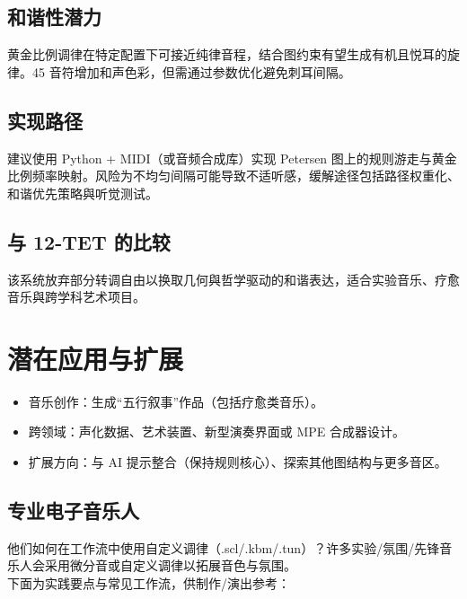 \documentclass{article}
\begin{document}
\subsection{和谐性潜力}
黄金比例调律在特定配置下可接近纯律音程，结合图约束有望生成有机且悦耳的旋律。45 音符增加和声色彩，但需通过参数优化避免刺耳间隔。

\subsection{实现路径}
建议使用 Python + MIDI（或音频合成库）实现 Petersen 图上的规则游走与黄金比例频率映射。风险为不均匀间隔可能导致不适听感，缓解途径包括路径权重化、和谐优先策略與听觉测试。

\subsection{与 12-TET 的比较}
该系统放弃部分转调自由以换取几何與哲学驱动的和谐表达，适合实验音乐、疗愈音乐與跨学科艺术项目。

\section{潜在应用与扩展}
\begin{itemize}
  \item 音乐创作：生成“五行叙事”作品（包括疗愈类音乐）。
  \item 跨领域：声化数据、艺术装置、新型演奏界面或 MPE 合成器设计。
  \item 扩展方向：与 AI 提示整合（保持规则核心）、探索其他图结构与更多音区。
\end{itemize}

\subsection{专业电子音乐人}
他们如何在工作流中使用自定义调律（.scl/.kbm/.tun）？许多实验/氛围/先锋音乐人会采用微分音或自定义调律以拓展音色与氛围。\\

下面为实践要点与常见工作流，供制作/演出参考：
\end{document}
